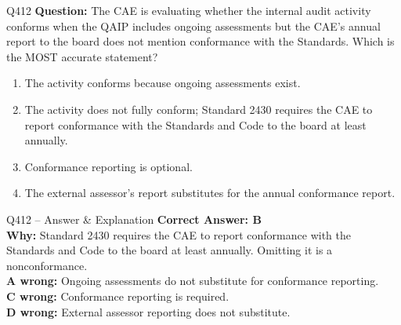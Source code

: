 \documentclass[aspectratio=169,10pt]{beamer}
\begin{document}
	\begin{frame}[t]{Q412}
		\small
		\textbf{Question:} The CAE is evaluating whether the internal audit activity conforms when the QAIP includes ongoing assessments but the CAE's annual report to the board does not mention conformance with the Standards. Which is the MOST accurate statement?
		\begin{enumerate}[label=\Alph*.,itemsep=1pt,topsep=2pt]
			\item The activity conforms because ongoing assessments exist.
			\item The activity does not fully conform; Standard 2430 requires the CAE to report conformance with the Standards and Code to the board at least annually.
			\item Conformance reporting is optional.
			\item The external assessor's report substitutes for the annual conformance report.
		\end{enumerate}
	\end{frame}
	
	\begin{frame}[t]{Q412 -- Answer \& Explanation}
		\small
		\textbf{Correct Answer: B} \\[4pt]
		\textbf{Why:} Standard 2430 requires the CAE to report conformance with the Standards and Code to the board at least annually. Omitting it is a nonconformance. \\[4pt]
		\textbf{A wrong:} Ongoing assessments do not substitute for conformance reporting. \\[2pt]
		\textbf{C wrong:} Conformance reporting is required. \\[2pt]
		\textbf{D wrong:} External assessor reporting does not substitute.
	\end{frame}
	
\end{document}
